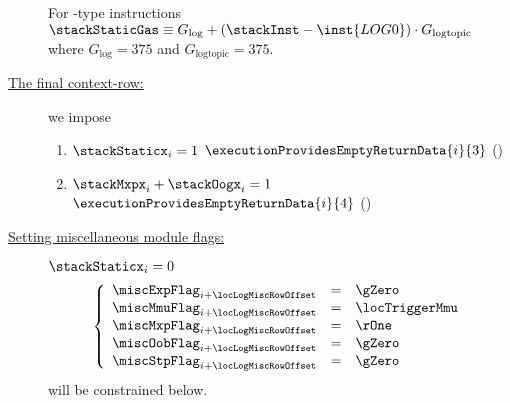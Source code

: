 \begin{description}
		\saNote{} For -type instructions $\stackStaticGas \equiv G_{\text{log}} + (\stackInst - \inst{LOG0}) \cdot G_{\text{logtopic}}$
		where $G_\text{log} = 375$ and $G_\text{logtopic} = 375$.
	\item[\underline{The final context-row:}]
		we impose
		\begin{enumerate}
			\item \If $\stackStaticx _{i} = 1$                \Then $\executionProvidesEmptyReturnData {i}{3} $ \quad(\trash)
			\item \If $\stackMxpx _{i} + \stackOogx _{i} = 1$ \Then $\executionProvidesEmptyReturnData {i}{4} $ \quad(\trash)
		\end{enumerate}
	\item[\underline{Setting miscellaneous module flags:}]
		\If $\stackStaticx_{i} = 0$ \Then
		\[
			\left\{ \begin{array}{lclr}
				\miscExpFlag_{i + \locLogMiscRowOffset} & = & \gZero         \\
				\miscMmuFlag_{i + \locLogMiscRowOffset} & = & \locTriggerMmu \\
				\miscMxpFlag_{i + \locLogMiscRowOffset} & = & \rOne          \\
				\miscOobFlag_{i + \locLogMiscRowOffset} & = & \gZero         \\
				\miscStpFlag_{i + \locLogMiscRowOffset} & = & \gZero         \\
			\end{array} \right.
		\]
		\saNote{}
		\locTriggerMmu{} will be constrained below.


\end{description}
